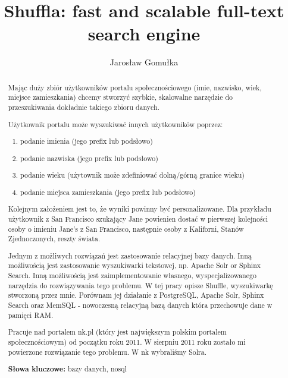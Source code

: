 \documentclass[10pt,a4paper]{article}
\begin{document}
\normalsize

\restoregeometry

\newpage
\thispagestyle{empty}

\begin{abstract}
Mając duży zbiór użytkowników portalu społecznościowego (imie, nazwisko, wiek, miejsce zamieszkania) chcemy stworzyć szybkie, skalowalne narzędzie do przeszukiwania dokładnie takiego zbioru danych.

Użytkownik portalu może wyszukiwać innych użytkowników poprzez:
\bigskip
\begin{enumerate}
\item{podanie imienia (jego prefix lub podsłowo) }
\item{podanie nazwiska (jego prefix lub podsłowo)}
\item{podanie wieku (użytownik może zdefiniować dolną/górną granice wieku)}
\item{podanie miejsca zamieszkania (jego prefix lub podsłowo)}
\end{enumerate}

\bigskip
Kolejnym założeniem jest to, że wyniki powinny być personalizowane. Dla przykładu użytkownik z San Francisco szukający Jane powienien dostać w pierwszej kolejności osoby o imieniu Jane's z San Francisco, następnie osoby z Kaliforni, Stanów Zjednoczonych, reszty świata. 

Jednym z możliwych rozwiązań jest zastosowanie relacyjnej bazy danych. Inną możliwością jest zastosowanie wyszukiwarki tekstowej, np. Apache Solr or Sphinx Search. Inną możliwością jest zaimplementowanie własnego, wyspecjalizowanego narzędzia do rozwiązywania tego problemu. W tej pracy opisze Shuffle, wyszukiwarkę stworzoną przez mnie. Porównam jej działanie z PostgreSQL, Apache Solr, Sphinx Search oraz MemSQL - nowoczesną relacyjną bazą danych która przechowuje dane w pamięci RAM.

\bigskip
Pracuje nad portalem nk.pl (który jest największym polskim portalem społecznościowym) od początku roku 2011. W sierpniu 2011 roku zostało mi powierzone rozwiązanie tego problemu. W nk wybraliśmy Solra.

\bigskip
\noindent \textbf{Słowa kluczowe:} bazy danych, nosql
\end{abstract}



\title{Shuffla: fast and scalable full-text search engine}
\author{Jarosław Gomułka}
\end{document}
